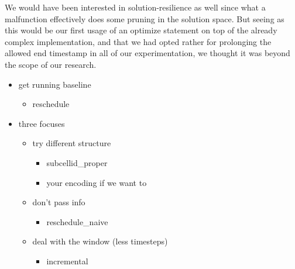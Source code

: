 We would have been interested in solution-resilience as well since what a malfunction effectively does some pruning in the solution space. But seeing as this would be our first usage of an optimize statement on top of the already complex implementation, and that we had opted rather for prolonging the allowed end timestamp in all of our experimentation, we thought it was beyond the scope of our research.



\color{green}
\begin{itemize}
	\item get running baseline 
	\begin{itemize}
		\item reschedule
	\end{itemize}
	\item three focuses
	\begin{itemize}
		\item try different structure
		\begin{itemize}
			\item subcellid\_proper
			\item your encoding if we want to
		\end{itemize}
		\item don't pass info
		\begin{itemize}
			\item reschedule\_naive
		\end{itemize}
		\item deal with the window (less timesteps)
		\begin{itemize}
			\item incremental
		\end{itemize}
	\end{itemize}
\end{itemize}
\color{black}







